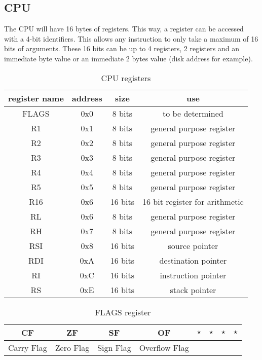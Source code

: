 \documentclass[a4paper,12pt]{article}
\begin{document}
\subsection{CPU}

The CPU will have 16 bytes of registers. This way, a register can be accessed with a 4-bit identifiers. This allows any instruction to only take a maximum of 16 bits of arguments. These 16 bits can be up to 4 registers, 2 registers and an immediate byte value or an immediate 2 bytes value (disk address for example).

\begin{table}[H]
    \centering
    \begin{tabular}{|c|c|c|c|}
        \hline
        register name & address  & size & use \\ 
        \hline
        FLAGS  & 0x0 & 8 bits  & to be determined \\
        R1     & 0x1 & 8 bits  & general purpose register \\
        R2     & 0x2 & 8 bits  & general purpose register \\
        R3     & 0x3 & 8 bits  & general purpose register \\
        R4     & 0x4 & 8 bits  & general purpose register \\
        R5     & 0x5 & 8 bits  & general purpose register \\
        R16    & 0x6 & 16 bits & 16 bit register for arithmetic \\
        RL     & 0x6 & 8 bits  & general purpose register \\
        RH     & 0x7 & 8 bits  & general purpose register \\
        RSI    & 0x8 & 16 bits & source pointer \\
        RDI    & 0xA & 16 bits & destination pointer \\
        RI     & 0xC & 16 bits & instruction pointer \\
        RS     & 0xE & 16 bits & stack pointer \\
        \hline
    \end{tabular}
    \caption{CPU registers}
    \label{tab:CPU registers}
\end{table}

\begin{table}[h]
    \centering
    \begin{tabular}{|c|c|c|c|c|c|c|c|}
        \hline
        CF  & ZF  & SF  & OF & $\star$ & $\star$ & $\star$ & $\star$ \\
        \hline
        Carry Flag & Zero Flag & Sign Flag & Overflow Flag & & & & \\
        \hline
    \end{tabular}
    \caption{FLAGS register}
    \label{tab:flags}
\end{table}
\end{document}
